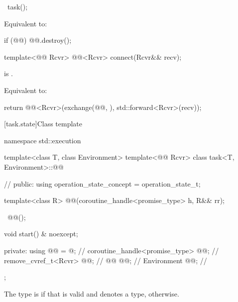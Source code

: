 %
\begin{itemdecl}
~task();
\end{itemdecl}
\begin{itemdescr}
\pnum
\effects
Equivalent to:
\begin{codeblock}
if (@@)
  @@.destroy();
\end{codeblock}
\end{itemdescr}

%
\begin{itemdecl}
template<@@ Rcvr>
  @@<Rcvr> connect(Rcvr&& recv);
\end{itemdecl}
\begin{itemdescr}
\pnum
\expects
{} is .

\pnum
\effects
Equivalent to:
\begin{codeblock}
return @@<Rcvr>(exchange(@@, {}), std::forward<Rcvr>(recv));
\end{codeblock}
\end{itemdescr}

[task.state]{Class template }

\begin{codeblock}
namespace std::execution {
  template<class T, class Environment>
  template<@@ Rcvr>
  class task<T, Environment>::@@ {           // \expos
  public:
    using operation_state_concept = operation_state_t;

    template<class R>
      @@(coroutine_handle<promise_type> h, R&& rr);

    ~@@();

    void start() & noexcept;

  private:
    using @@ = @\seebelownc@;                // \expos
    coroutine_handle<promise_type> @@;      // \expos
    remove_cvref_t<Rcvr>           @@;        // \expos
    @@                      @@;     // \expos
    Environment                    @@; // \expos
  };
}
\end{codeblock}

\pnum
The type  is  if that
 is valid and denotes a type,  otherwise.

